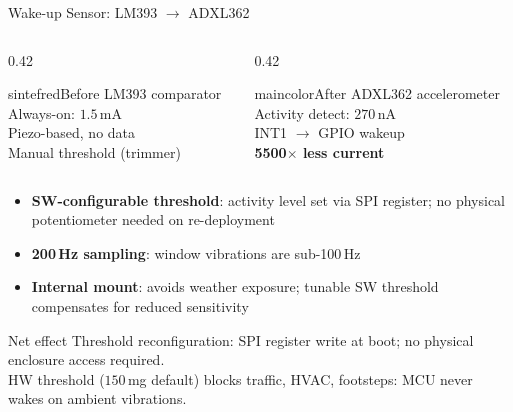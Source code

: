 \begin{frame}[shrink=15]{Wake-up Sensor: LM393 $\rightarrow$ ADXL362}

\begin{columns}[T,onlytextwidth]
\hfill
\begin{column}{0.42\textwidth}
  \begin{colorblock}[white]{sintefred}{\small Before}
  \scriptsize
  LM393 comparator\\[2pt]
  Always-on: $1.5\,\text{mA}$\\
  Piezo-based, no data\\
  Manual threshold (trimmer)
  \end{colorblock}
\end{column}
\hfill
\begin{column}{0.42\textwidth}
  \begin{colorblock}[white]{maincolor}{\small After}
  \scriptsize
  ADXL362 accelerometer\\[2pt]
  Activity detect: $270\,\text{nA}$\\
  INT1 $\rightarrow$ GPIO wakeup\\
  \textbf{5500$\times$ less current}
  \end{colorblock}
\end{column}
\hfill
\end{columns}

\vspace{0.3cm}
\begin{itemize}\setlength\itemsep{4pt}
  \item \textbf{SW-configurable threshold}: activity level set via SPI register; no physical potentiometer needed on re-deployment
  \item \textbf{200\,Hz sampling}: window vibrations are sub-100\,Hz
  \item \textbf{Internal mount}: avoids weather exposure; tunable SW threshold compensates for reduced sensitivity
\end{itemize}

\vspace{0.2cm}
\begin{block}{Net effect}
\scriptsize Threshold reconfiguration: SPI register write at boot; no physical enclosure access required.\\
HW threshold ($150$\,mg default) blocks traffic, HVAC, footsteps: MCU never wakes on ambient vibrations.
\end{block}

\end{frame}
